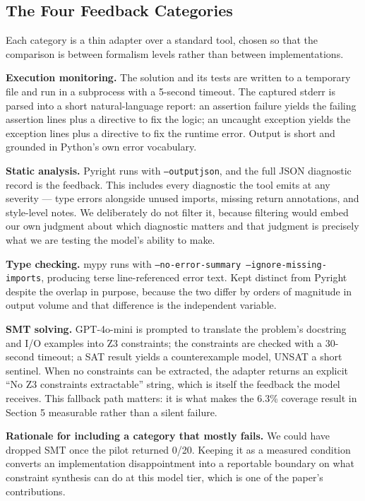 \subsection{The Four Feedback Categories}

Each category is a thin adapter over a standard tool, chosen so that the comparison is between formalism levels rather than between implementations.

\textbf{Execution monitoring.} The solution and its tests are written to a temporary file and run in a subprocess with a 5-second timeout. The captured stderr is parsed into a short natural-language report: an assertion failure yields the failing assertion lines plus a directive to fix the logic; an uncaught exception yields the exception lines plus a directive to fix the runtime error. Output is short and grounded in Python's own error vocabulary.

\textbf{Static analysis.} Pyright runs with \texttt{--outputjson}, and the full JSON diagnostic record is the feedback. This includes every diagnostic the tool emits at any severity --- type errors alongside unused imports, missing return annotations, and style-level notes. We deliberately do not filter it, because filtering would embed our own judgment about which diagnostic matters and that judgment is precisely what we are testing the model's ability to make.

\textbf{Type checking.} mypy runs with \texttt{--no-error-summary --ignore-missing-imports}, producing terse line-referenced error text. Kept distinct from Pyright despite the overlap in purpose, because the two differ by orders of magnitude in output volume and that difference is the independent variable.

\textbf{SMT solving.} GPT-4o-mini is prompted to translate the problem's docstring and I/O examples into Z3 constraints; the constraints are checked with a 30-second timeout; a SAT result yields a counterexample model, UNSAT a short sentinel. When no constraints can be extracted, the adapter returns an explicit ``No Z3 constraints extractable'' string, which is itself the feedback the model receives. This fallback path matters: it is what makes the 6.3\% coverage result in Section 5 measurable rather than a silent failure.

\textbf{Rationale for including a category that mostly fails.} We could have dropped SMT once the pilot returned 0/20. Keeping it as a measured condition converts an implementation disappointment into a reportable boundary on what constraint synthesis can do at this model tier, which is one of the paper's contributions.

